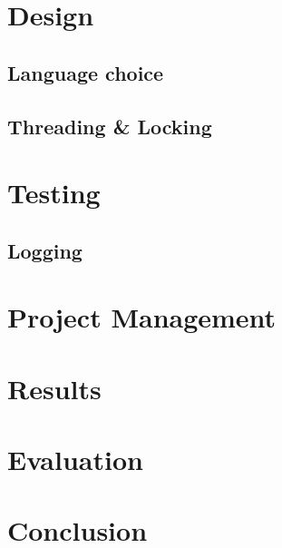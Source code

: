 \documentclass[11pt,a4paper,british,twocolumn]{bhamarticle}
\begin{document}
\section{Design}
    \subsection{Language choice}
    \subsection{Threading \& Locking}

\section{Testing}
    \subsection{Logging}

\section{Project Management}

\section{Results}

\section{Evaluation} %

\section{Conclusion}

\printbibliography %
\end{document}
